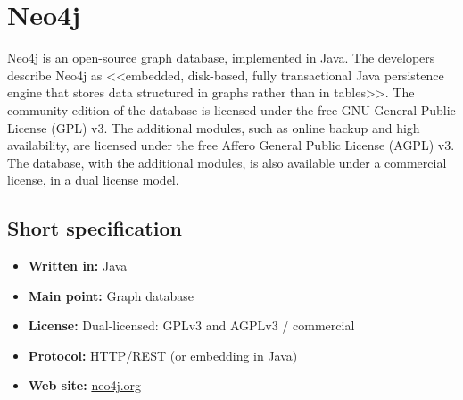 \chapter{Neo4j}
Neo4j is an open-source graph database, implemented in Java. The developers describe Neo4j as <<embedded, disk-based, fully transactional Java persistence engine that stores data structured in graphs rather than in tables>>. The community edition of the database is licensed under the free GNU General Public License (GPL) v3. The additional modules, such as online backup and high availability, are licensed under the free Affero General Public License (AGPL) v3. The database, with the additional modules, is also available under a commercial license, in a dual license model.
\section{Short specification}

\begin{itemize}
  \item \textbf{Written in:} Java
  \item \textbf{Main point:} Graph database
  \item \textbf{License:} Dual-licensed: GPLv3 and AGPLv3 / commercial
  \item \textbf{Protocol:} HTTP/REST (or embedding in Java)
  \item \textbf{Web site:} \href{http://neo4j.org/}{neo4j.org}
\end{itemize}